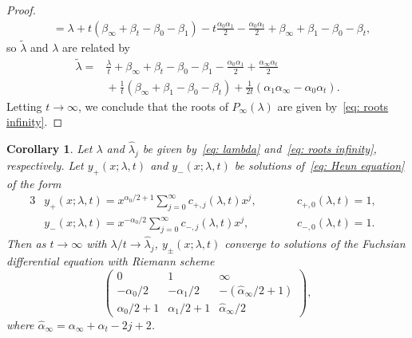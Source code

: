 \documentclass[pdftex]{sigma}
\numberwithin{equation}{section}
\newtheorem{Corollary}[Theorem]{Corollary}
\def\wt#1{\widetilde{#1}}
\begin{document}
\begin{proof}
\begin{align*}
 &{}=\lambda+t(\beta_\infty+\beta_t-\beta_0-\beta_1)-t\frac{\alpha_0\alpha_1}{2}
 -\frac{\alpha_0\alpha_t}{2}+\beta_\infty+\beta_1-\beta_0-\beta_t, \end{align*}
 so $\wt\lambda$ and $\lambda$ are related by
 {\allowdisplaybreaks
 \begin{align*}
 \wt\lambda={}&\frac\lambda t+\beta_\infty+\beta_t-\beta_0-\beta_1
 -\frac{\alpha_0\alpha_1}2+\frac{\alpha_\infty\alpha_t}2 \\
 &{}+\frac1t(\beta_\infty+\beta_1-\beta_0-\beta_t)
 +\frac1{2t}(\alpha_1\alpha_\infty-\alpha_0\alpha_t).
 \end{align*}
 }%
 Letting $t\to\infty$, we conclude that the roots of
 $P_\infty(\lambda)$ are given by~\eqref{eq: roots infinity}.
\end{proof}

\begin{Corollary}
 \label{corollary: limiting equations}
 Let $\lambda$ and $\hat\lambda_j$ be given by~\eqref{eq: lambda} and~\eqref{eq: roots infinity}, respectively.
 Let $y_+(x;\lambda,t)$ and $y_-(x;\lambda,t)$ be solutions of~\eqref{eq: Heun equation} of the form
\begin{alignat*}{3}
 & y_+(x;\lambda,t)=x^{\alpha_0/2+1}\sum_{j=0}^\infty
 c_{+,j}(\lambda,t)x^j, \qquad && c_{+,0}(\lambda,t)=1,&
\\
 & y_-(x;\lambda,t)=x^{-\alpha_0/2}\sum_{j=0}^\infty
 c_{-,j}(\lambda,t)x^j, \qquad && c_{-,0}(\lambda,t)=1.&
\end{alignat*}
 Then as $t\to\infty$ with $\lambda/t\to\hat\lambda_j$,
 $y_\pm(x;\lambda,t)$ converge to solutions of the Fuchsian
 differential equation with Riemann scheme
 \begin{equation} \label{eq: RS infinity}
 \begin{pmatrix}
 0 & 1 & \infty \\
 -\alpha_0/2 & -\alpha_1/2 & -(\hat\alpha_\infty/2+1) \\
 \alpha_0/2+1 & \alpha_1/2+1 & \hat\alpha_\infty/2
 \end{pmatrix},
 \end{equation}
 where $\hat\alpha_\infty=\alpha_\infty+\alpha_t-2j+2$.
\end{Corollary}
\end{document}
